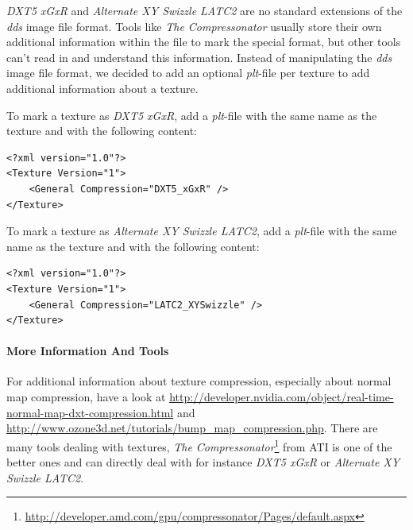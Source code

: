 \emph{DXT5 xGxR} and \emph{Alternate XY Swizzle LATC2} are no standard extensions of the \emph{dds} image file format. Tools like \emph{The Compressonator} usually store their own additional information within the file to mark the special format, but other tools can't read in and understand this information. Instead of manipulating the \emph{dds} image file format, we decided to add an optional \emph{plt}-file per texture to add additional information about a texture.

To mark a texture as \emph{DXT5 xGxR}, add a \emph{plt}-file with the same name as the texture and with the following content:
\begin{lstlisting}[caption=\emph{plt}-file \emph{DXT5 xGxR} normal map compression]
<?xml version="1.0"?>
<Texture Version="1">
    <General Compression="DXT5_xGxR" />
</Texture>
\end{lstlisting}

To mark a texture as \emph{Alternate XY Swizzle LATC2}, add a \emph{plt}-file with the same name as the texture and with the following content:
\begin{lstlisting}[caption=\emph{plt}-file \emph{Alternate XY Swizzle LATC2} normal map compression]
<?xml version="1.0"?>
<Texture Version="1">
    <General Compression="LATC2_XYSwizzle" />
</Texture>
\end{lstlisting}


\paragraph{More Information And Tools}
For additional information about texture compression, especially about normal map compression, have a look at 
\url{http://developer.nvidia.com/object/real-time-normal-map-dxt-compression.html} and \url{http://www.ozone3d.net/tutorials/bump_map_compression.php}.
There are many tools dealing with textures, \emph{The Compressonator}\footnote{\url{http://developer.amd.com/gpu/compressonator/Pages/default.aspx}} from ATI is one of the better ones and can directly deal with for instance \emph{DXT5 xGxR} or \emph{Alternate XY Swizzle LATC2}.
